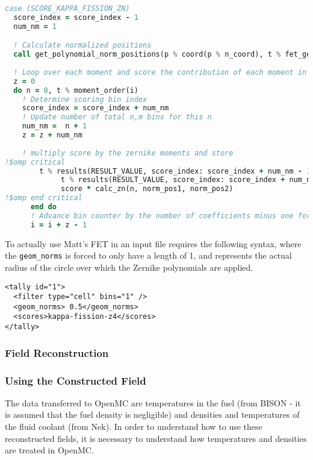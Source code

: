 \documentclass[10pt]{article}
\numberwithin{equation}{section} %
\begin{document}
\begin{lstlisting}[language=Fortran]
case (SCORE_KAPPA_FISSION_ZN)
  score_index = score_index - 1
  num_nm = 1

  ! Calculate normalized positions
  call get_polynomial_norm_positions(p % coord(p % n_coord), t % fet_geom_norm, norm_pos1, norm_pos2, SCORE_KAPPA_FISSION_ZN)
      
  ! Loop over each moment and score the contribution of each moment in the appropriate bin
  z = 0
  do n = 0, t % moment_order(i)
    ! Determine scoring bin index
    score_index = score_index + num_nm
    ! Update number of total n,m bins for this n
    num_nm =  n + 1
    z = z + num_nm
    
    ! multiply score by the zernike moments and store
!$omp critical
        t % results(RESULT_VALUE, score_index: score_index + num_nm - 1, filter_index) = &
             t % results(RESULT_VALUE, score_index: score_index + num_nm - 1, filter_index) + &
             score * calc_zn(n, norm_pos1, norm_pos2)
!$omp end critical
      end do
      ! Advance bin counter by the number of coefficients minus one for later update
      i = i + z - 1
\end{lstlisting}

To actually use Matt's FET in an input file requires the following syntax, where the {\tt geom\_norms} is forced to only have a length of 1, and represents the actual radius of the circle over which the Zernike polynomials are applied.

\begin{lstlisting}
<tally id="1">
  <filter type="cell" bins="1" />
  <geom_norms> 0.5</geom_norms>
  <scores>kappa-fission-z4</scores>
</tally>
\end{lstlisting}

\subsubsection{Field Reconstruction}

\subsubsection{Using the Constructed Field}
The data transferred to OpenMC are temperatures in the fuel (from BISON - it is assumed that the fuel density is negligible) and densities and temperatures of the fluid coolant (from Nek). In order to understand how to use these reconstructed fields, it is necessary to understand how temperatures and densities are treated in OpenMC.
\end{document}
